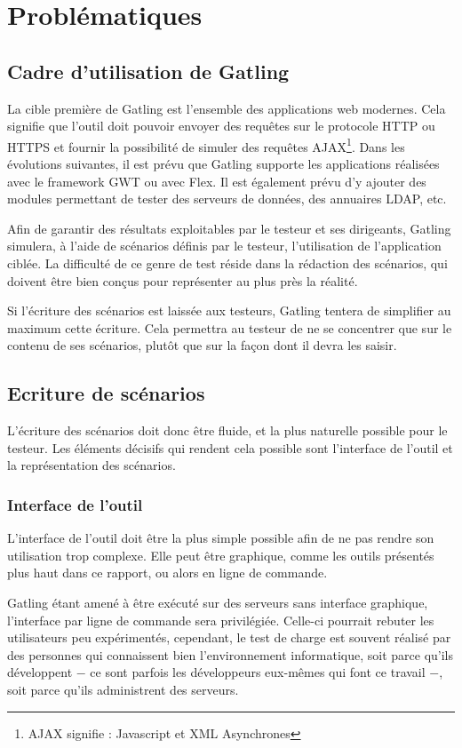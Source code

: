 \chapter{Problématiques}
\label{chap_pb}

\section{Cadre d'utilisation de Gatling}
La cible première de Gatling est l'ensemble des applications web modernes. Cela signifie que l'outil doit pouvoir envoyer des requêtes sur le protocole HTTP ou HTTPS et fournir la possibilité de simuler des requêtes AJAX\footnote{AJAX signifie  : Javascript et XML Asynchrones}. Dans les évolutions suivantes, il est prévu que Gatling supporte les applications réalisées avec le framework GWT ou avec Flex. Il est également prévu d'y ajouter des modules permettant de tester des serveurs de données, des annuaires LDAP, etc.

Afin de garantir des résultats exploitables par le testeur et ses dirigeants, Gatling simulera, à l'aide de scénarios définis par le testeur, l'utilisation de l'application ciblée. La difficulté de ce genre de test réside dans la rédaction des scénarios, qui doivent être bien conçus pour représenter au plus près la réalité.

Si l'écriture des scénarios est laissée aux testeurs, Gatling tentera de simplifier au maximum cette écriture. Cela permettra au testeur de ne se concentrer que sur le contenu de ses scénarios, plutôt que sur la façon dont il devra les saisir. 

\section{Ecriture de scénarios}
L'écriture des scénarios doit donc être fluide, et la plus naturelle possible pour le testeur. Les éléments décisifs qui rendent cela possible sont l'interface de l'outil et la représentation des scénarios.

\subsection{Interface de l'outil}
L'interface de l'outil doit être la plus simple possible afin de ne pas rendre son utilisation trop complexe. Elle peut être graphique, comme les outils présentés plus haut dans ce rapport, ou alors en ligne de commande. 

Gatling étant amené à être exécuté sur des serveurs sans interface graphique, l'interface par ligne de commande sera privilégiée. Celle-ci pourrait rebuter les utilisateurs peu expérimentés, cependant, le test de charge est souvent réalisé par des personnes qui connaissent bien l'environnement informatique, soit parce qu'ils développent $-$ ce sont parfois les développeurs eux-mêmes qui font ce travail $-$, soit parce qu'ils administrent des serveurs.

